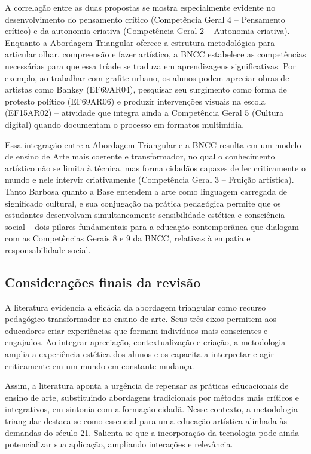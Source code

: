 \documentclass[portuguese]{textolivre}
\begin{document}
A correlação entre as duas propostas se mostra especialmente evidente no desenvolvimento do pensamento crítico (Competência Geral 4 – Pensamento crítico) e da autonomia criativa (Competência Geral 2 – Autonomia criativa). Enquanto a Abordagem Triangular oferece a estrutura metodológica para articular olhar, compreensão e fazer artístico, a BNCC estabelece as competências necessárias para que essa tríade se traduza em aprendizagens significativas. Por exemplo, ao trabalhar com grafite urbano, os alunos podem apreciar obras de artistas como Banksy (EF69AR04), pesquisar seu surgimento como forma de protesto político (EF69AR06) e produzir intervenções visuais na escola (EF15AR02) – atividade que integra ainda a Competência Geral 5 (Cultura digital) quando documentam o processo em formatos multimídia.

Essa integração entre a Abordagem Triangular e a BNCC resulta em um modelo de ensino de Arte mais coerente e transformador, no qual o conhecimento artístico não se limita à técnica, mas forma cidadãos capazes de ler criticamente o mundo e nele intervir criativamente (Competência Geral 3 – Fruição artística). Tanto Barbosa quanto a Base entendem a arte como linguagem carregada de significado cultural, e sua conjugação na prática pedagógica permite que os estudantes desenvolvam simultaneamente sensibilidade estética e consciência social – dois pilares fundamentais para a educação contemporânea que dialogam com as Competências Gerais 8 e 9 da BNCC, relativas à empatia e responsabilidade social.

\subsection{Considerações finais da revisão}
A literatura evidencia a eficácia da abordagem triangular como recurso pedagógico transformador no ensino de arte. Seus três eixos permitem aos educadores criar experiências que formam indivíduos mais conscientes e engajados. Ao integrar apreciação, contextualização e criação, a metodologia amplia a experiência estética dos alunos e os capacita a interpretar e agir criticamente em um mundo em constante mudança.

Assim, a literatura aponta a urgência de repensar as práticas educacionais de ensino de arte, substituindo abordagens tradicionais por métodos mais críticos e integrativos, em sintonia com a formação cidadã. Nesse contexto, a metodologia triangular destaca-se como essencial para uma educação artística alinhada às demandas do século 21. Salienta-se que a incorporação da tecnologia pode ainda potencializar sua aplicação, ampliando interações e relevância.
\end{document}
